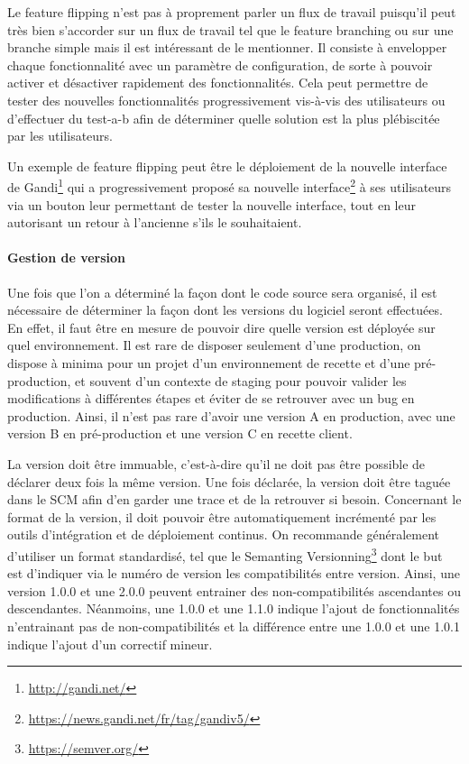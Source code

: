 
Le feature flipping n'est pas à proprement parler un flux de travail puisqu'il peut très bien s'accorder sur un flux de travail tel que le feature branching ou sur une branche simple mais il est intéressant de le mentionner. Il consiste à envelopper chaque fonctionnalité avec un paramètre de configuration, de sorte à pouvoir activer et désactiver rapidement des fonctionnalités. Cela peut permettre de tester des nouvelles fonctionnalités progressivement vis-à-vis des utilisateurs ou d'effectuer du \gls{test-a-b} afin de déterminer quelle solution est la plus plébiscitée par les utilisateurs. 

Un exemple de feature flipping peut être le déploiement de la nouvelle interface de Gandi\footnote{\url{http://gandi.net/}} qui a progressivement proposé sa nouvelle interface\footnote{\url{https://news.gandi.net/fr/tag/gandiv5/}} à ses utilisateurs via un bouton leur permettant de tester la nouvelle interface, tout en leur autorisant un retour à l'ancienne s'ils le souhaitaient. 

\paragraph{Gestion de version}\label{gestion-de-version}

Une fois que l'on a déterminé la façon dont le code source sera organisé, il est nécessaire de déterminer la façon dont les versions du logiciel seront effectuées. En effet, il faut être en mesure de pouvoir dire quelle version est déployée sur quel environnement. Il est rare de disposer seulement d'une production, on dispose à minima pour un projet d'un environnement de recette et d'une pré-production, et souvent d'un contexte de staging pour pouvoir valider les modifications à différentes étapes et éviter de se retrouver avec un bug en production. Ainsi, il n'est pas rare d'avoir une version A en production, avec une version B en pré-production et une version C en recette client.

La version doit être immuable, c'est-à-dire qu'il ne doit pas être possible de déclarer deux fois la même version. Une fois déclarée, la version doit être taguée dans le \gls{SCM} afin d'en garder une trace et de la retrouver si besoin. Concernant le format de la version, il doit pouvoir être automatiquement incrémenté par les outils d'intégration et de déploiement continus. On recommande généralement d'utiliser un format standardisé, tel que le Semanting Versionning\footnote{\url{https://semver.org/}} dont le but est d'indiquer via le numéro de version les compatibilités entre version. Ainsi, une version 1.0.0 et une 2.0.0 peuvent entrainer des non-compatibilités ascendantes ou descendantes. Néanmoins, une 1.0.0 et une 1.1.0 indique l'ajout de fonctionnalités n'entrainant pas de non-compatibilités et la différence entre une 1.0.0 et une 1.0.1 indique l'ajout d'un correctif mineur.

